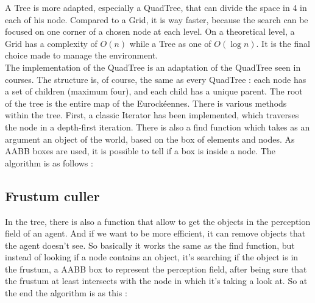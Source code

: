 A Tree is more adapted, especially a QuadTree, that can divide the space in 4 in
each of his node. Compared to a Grid, it is way faster, because the search can
be focused on one corner of a chosen node at each level. On a theoretical level,
a Grid has a complexity of $O(n)$ while a Tree as one of $O(\log n)$. It is the
final choice made to manage the environment.\\

The implementation of the QuadTree is an adaptation of the QuadTree seen in
courses. The structure is, of course, the same as every QuadTree : each node has
a set of children (maximum four), and each child has a unique parent. The root
of the tree is the entire map of the Eurockéennes. There is various methods
within the tree. First, a classic Iterator has been implemented, which traverses
the node in a depth-first iteration. There is also a find function which takes
as an argument an object of the world, based on the box of elements and nodes.
As AABB boxes are used, it is possible to tell if a box is inside a node. The
algorithm is as follows :\\

\begin{algorithm}[H]
\end{algorithm}

\subsection{Frustum culler}

In the tree, there is also a function that allow to get the objects in the
perception field of an agent. And if we want to be more efficient, it can remove
objects that the agent doesn’t see. So basically it works the same as the find
function, but instead of looking if a node contains an object, it’s searching if
the object is in the frustum, a AABB box to represent the perception field,
after being sure that the frustum at least intersects with the node in which
it’s taking a look at. So at the end the algorithm is as this :\\

\begin{algorithm}[H]
\end{algorithm}

